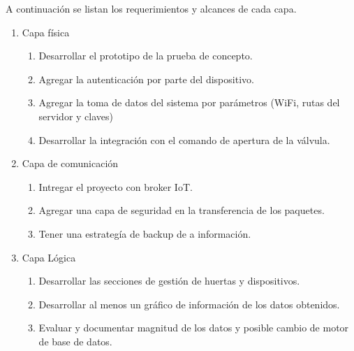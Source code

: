 A continuación se listan los requerimientos y alcances de cada capa.
\begin{enumerate}
\item Capa física
	\begin{enumerate}
		\item Desarrollar el prototipo de la prueba de concepto.
		\item Agregar la autenticación por parte del dispositivo.
		\item Agregar la toma de datos del sistema por parámetros (WiFi, rutas del servidor y claves)
		\item Desarrollar la integración con el comando de apertura de la válvula.
	\end{enumerate}
\item Capa de comunicación
	\begin{enumerate}
		\item Intregar el proyecto con broker IoT.
		\item Agregar una capa de seguridad en la transferencia de los paquetes.
		\item Tener una estrategía de backup de a información.
	\end{enumerate}
\item Capa Lógica
	\begin{enumerate}
		\item Desarrollar las secciones de gestión de huertas y dispositivos.
		\item Desarrollar al menos un gráfico de información de los datos obtenidos.
		\item Evaluar y documentar magnitud de los datos y posible cambio de motor de base de datos. 
	\end{enumerate}
\end{enumerate}

